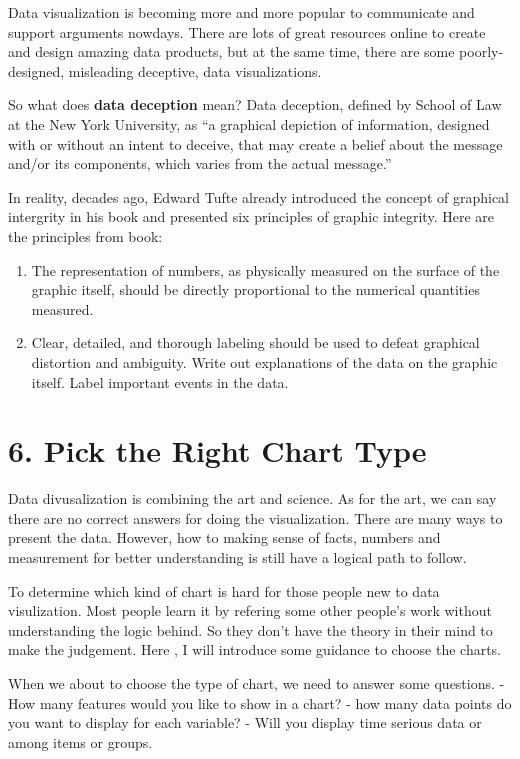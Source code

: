 \documentclass[]{book}
\theoremstyle{definition}
\theoremstyle{definition}
\theoremstyle{definition}
\theoremstyle{remark}
\begin{document}
Data visualization is becoming more and more popular to communicate and
support arguments nowdays. There are lots of great resources online to
create and design amazing data products, but at the same time, there are
some poorly-designed, misleading deceptive, data visualizations.

So what does \textbf{data deception} mean? Data deception, defined by
School of Law at the New York University, as ``a graphical depiction of
information, designed with or without an intent to deceive, that may
create a belief about the message and/or its components, which varies
from the actual message.''

In reality, decades ago, Edward Tufte already introduced the concept of
graphical intergrity in his book and presented six principles of graphic
integrity. Here are the principles from book:

\begin{enumerate}
\def\labelenumi{\arabic{enumi}.}
\item
  The representation of numbers, as physically measured on the surface
  of the graphic itself, should be directly proportional to the
  numerical quantities measured.
\item
  Clear, detailed, and thorough labeling should be used to defeat
  graphical distortion and ambiguity. Write out explanations of the data
  on the graphic itself. Label important events in the data.
\end{enumerate}

\section{6. Pick the Right Chart
Type}\label{pick-the-right-chart-type-1}

Data divusalization is combining the art and science. As for the art, we
can say there are no correct answers for doing the visualization. There
are many ways to present the data. However, how to making sense of
facts, numbers and measurement for better understanding is still have a
logical path to follow.

To determine which kind of chart is hard for those people new to data
visulization. Most people learn it by refering some other people's work
without understanding the logic behind. So they don't have the theory in
their mind to make the judgement. Here , I will introduce some guidance
to choose the charts.

When we about to choose the type of chart, we need to answer some
questions. - How many features would you like to show in a chart? - how
many data points do you want to display for each variable? - Will you
display time serious data or among items or groups.
\end{document}
